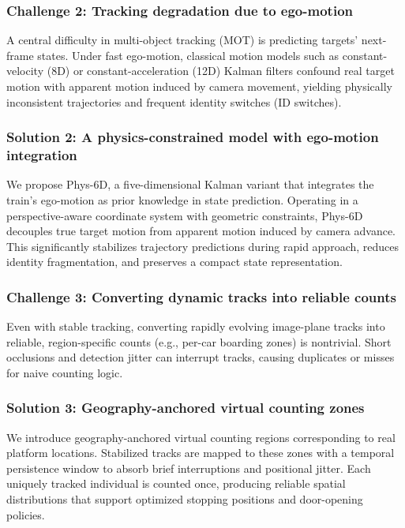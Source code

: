 \subsubsection{Challenge 2: Tracking degradation due to ego-motion}
A central difficulty in multi-object tracking (MOT) is predicting targets’ next-frame states\cite{104,103}. Under fast ego-motion, classical motion models such as constant-velocity (8D) or constant-acceleration (12D) Kalman filters confound real target motion with apparent motion induced by camera movement, yielding physically inconsistent trajectories and frequent identity switches (ID switches).

\subsubsection{Solution 2: A physics-constrained model with ego-motion integration}
We propose Phys-6D, a five-dimensional Kalman variant that integrates the train’s ego-motion as prior knowledge in state prediction. Operating in a perspective-aware coordinate system with geometric constraints, Phys-6D decouples true target motion from apparent motion induced by camera advance. This significantly stabilizes trajectory predictions during rapid approach, reduces identity fragmentation, and preserves a compact state representation.

\subsubsection{Challenge 3: Converting dynamic tracks into reliable counts}
Even with stable tracking, converting rapidly evolving image-plane tracks into reliable, region-specific counts (e.g., per-car boarding zones) is nontrivial. Short occlusions and detection jitter can interrupt tracks, causing duplicates or misses for naive counting logic.

\subsubsection{Solution 3: Geography-anchored virtual counting zones}
We introduce geography-anchored virtual counting regions corresponding to real platform locations. Stabilized tracks are mapped to these zones with a temporal persistence window to absorb brief interruptions and positional jitter. Each uniquely tracked individual is counted once, producing reliable spatial distributions that support optimized stopping positions and door-opening policies.

